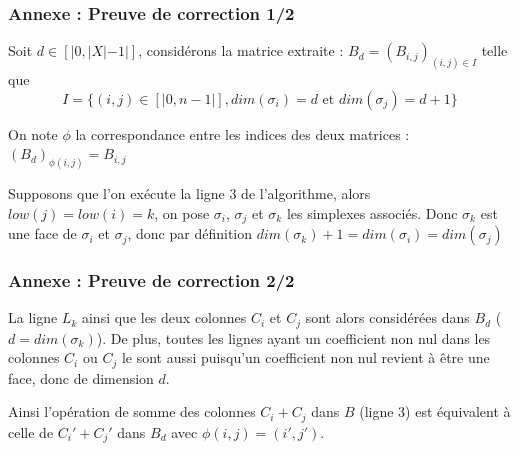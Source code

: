 \documentclass{beamer}
\begin{document}
\begin{frame}
    \frametitle{Annexe : Preuve de correction 1/2}
    Soit $d \in [|0, |X| - 1|]$, considérons la matrice extraite : $B_d = (B_{i,j})_{(i,j) \in I}$
    telle que $$I = \{(i,j) \in [|0,n-1|], dim(\sigma_i) = d \text{ et } dim(\sigma_j)=d+1\}$$

    On note $\phi$ la correspondance entre les indices des deux matrices : $(B_d)_{\phi(i,j)} = B_{i,j}$

    Supposons que l'on exécute la ligne 3 de l'algorithme, alors $low(j)=low(i) = k$, on pose $\sigma_i$, $\sigma_j$ et $\sigma_k$ les simplexes associés. Donc $\sigma_k$ est une face de $\sigma_i$ et $\sigma_j$, donc par définition 
    $ dim(\sigma_k) + 1 = dim(\sigma_i) = dim(\sigma_j) $
\end{frame}
\begin{frame}
    \frametitle{Annexe : Preuve de correction 2/2}
La ligne $L_k$ ainsi que les deux colonnes $C_i$ et $C_j$ sont alors considérées dans $B_d$ ($d = dim(\sigma_k)$). De plus, toutes les lignes ayant un coefficient non nul dans les colonnes $C_i$ ou $C_j$ le sont aussi puisqu'un coefficient non nul revient à être une face, donc de dimension $d$. 

Ainsi l'opération de somme des colonnes $C_i + C_j$ dans $B$ (ligne 3) est équivalent à celle de $C_i' + C_j'$ dans $B_d$ avec $\phi(i,j) = (i',j')$.
\end{frame}
\end{document}

